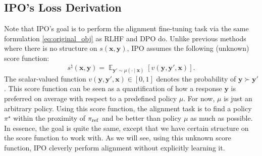 \documentclass[11pt,a4paper]{article}
\begin{document}
\subsection{IPO's Loss Derivation}%
\label{sub:ipo_s_loss_derivation}

Note that IPO's goal is to perform the alignment fine-tuning task via the same formulation \eqref{eq:original_obj} as RLHF and DPO do. Unlike previous methods where there is no structure on $s(\bm{x}, \bm{y})$, IPO assumes the following (unknown) score function:
\begin{equation}
\label{eq:s_v}
s^{\natural}(\bm{x}, \bm{y}) =  \mathop{\mathbb{E}}_{\bm{y}' \sim \mu(\cdot \mid \bm{x})} \left[ v(\bm{y}, \bm{y}', \bm{x}) \right].
\end{equation} 
The scalar-valued function $v(\bm{y}, \bm{y}', \bm{x})\in [0,1]$ denotes the probability of $\bm{y} \succ \bm{y}'$. This score function can be seen as a quantification of how a response $\bm{y}$ is preferred on average with respect to a predefined policy $\mu$. For now, $\mu$ is just an arbitrary policy.
Using this score function, the alignment task is to find a policy $\pi^{\star }$ within the proximity of $\pi_{\rm ref}$ and be better than policy $\mu$ as much as possible. In essence, the goal is quite the same, except that we have certain structure on the score function to work with. As we will see, using this unknown score function, IPO cleverly perform alignment without explicitly learning it.
\end{document}
